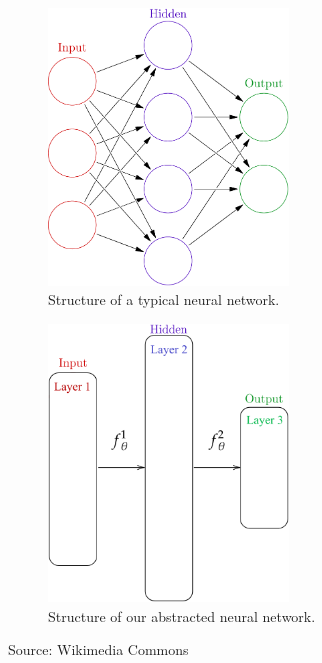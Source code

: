\documentclass[dissertation.tex]{subfiles}
\begin{document}
\begin{figure}[H]
  \centering
  \begin{subfigure}[t]{0.49\textwidth}
    \centering
    \includegraphics[width=0.7\textwidth]{figs/neural_network.png}
    \caption{
      Structure of a typical neural network.
    }
    \label{fig:nnOriginal}
  \end{subfigure}
  \hfill
  \begin{subfigure}[t]{0.49\textwidth}
    \centering
    \includegraphics[width=0.7\textwidth]{figs/neural_network_abstraction.png}
    \caption{
      Structure of our abstracted neural network.
    }
    \label{fig:nnModified}
  \end{subfigure}
    \caption{
      Source: Wikimedia Commons 
    }
\end{figure}
\end{document}
